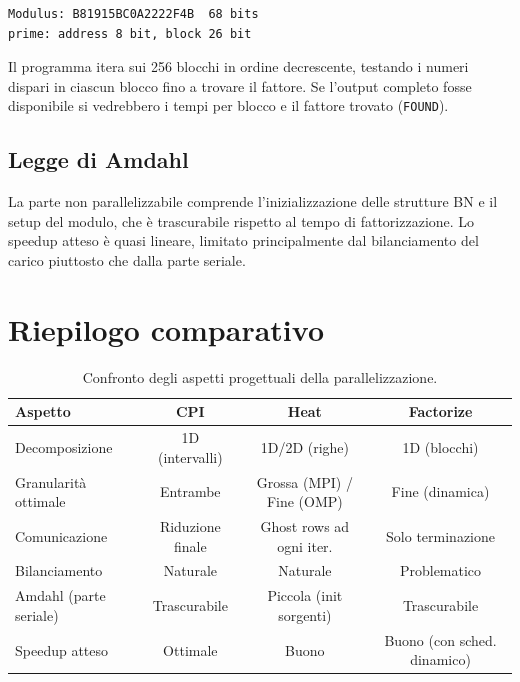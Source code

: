 \documentclass[a4paper,12pt]{article}
\begin{document}
\begin{verbatim}
Modulus: B81915BC0A2222F4B  68 bits
prime: address 8 bit, block 26 bit
\end{verbatim}

Il programma itera sui 256 blocchi in ordine decrescente, testando i numeri dispari in ciascun blocco fino a trovare il fattore. Se l'output completo fosse disponibile si vedrebbero i tempi per blocco e il fattore trovato (\texttt{FOUND}).

\subsection{Legge di Amdahl}

La parte non parallelizzabile comprende l'inizializzazione delle strutture BN e il setup del modulo, che \`e trascurabile rispetto al tempo di fattorizzazione. Lo speedup atteso \`e quasi lineare, limitato principalmente dal bilanciamento del carico piuttosto che dalla parte seriale.

\section{Riepilogo comparativo}

\begin{table}[H]
\centering
\begin{tabular}{lccc}
\toprule
\textbf{Aspetto} & \textbf{CPI} & \textbf{Heat} & \textbf{Factorize} \\
\midrule
Decomposizione & 1D (intervalli) & 1D/2D (righe) & 1D (blocchi) \\
Granularit\`a ottimale & Entrambe & Grossa (MPI) / Fine (OMP) & Fine (dinamica) \\
Comunicazione & Riduzione finale & Ghost rows ad ogni iter. & Solo terminazione \\
Bilanciamento & Naturale & Naturale & Problematico \\
Amdahl (parte seriale) & Trascurabile & Piccola (init sorgenti) & Trascurabile \\
Speedup atteso & Ottimale & Buono & Buono (con sched. dinamico) \\
\bottomrule
\end{tabular}
\caption{Confronto degli aspetti progettuali della parallelizzazione.}
\label{tab:confronto}
\end{table}
\end{document}
